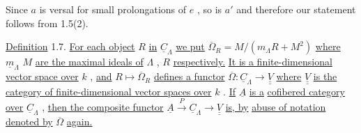 \begin{center}
\end{center}
Since  $a$  is versal for small prolongations of  $e$  , so is  $a'$ and therefore our statement follows from 1.5(2).

\underline{Definition} 1.7.   \underline{For each object}  $R$  \underline{in}  $\underline{C}_{\Lambda}$ \underline{we put}  $\overline{\Omega}_R = M/(m_{\Lambda}R+M^2)$  \underline{where}  $\underline{m}_{\Lambda}$ $M$  \underline{are the maximal ideals of}  $\Lambda$ ,  $R$  \underline{respectively.} \underline{It is a finite-dimensional vector space over}  $k$  , \underline{and}  $R \longmapsto \overline{\Omega}_R$  \underline{defines a functor}  $\overline{\Omega} : \underline{C}_{\Lambda} \rightarrow \underline{\underline{V}}$  \underline{where} $\underline{\underline{V}}$  \underline{is the category of finite-dimensional vector spaces over}  $k$  . \underline{If}  $\underline{A}$  \underline{is a} \underline{cofibered category over}  $\underline{C}_{\Lambda}$  , \underline{then the composite functor}  $\underline{A} \xrightarrow{\ P\ } \underline{C}_{\Lambda} \rightarrow \underline{\underline{V}}$  \underline{is, by} \underline{abuse of notation denoted by}  $\overline{\Omega}$  \underline{again.}

